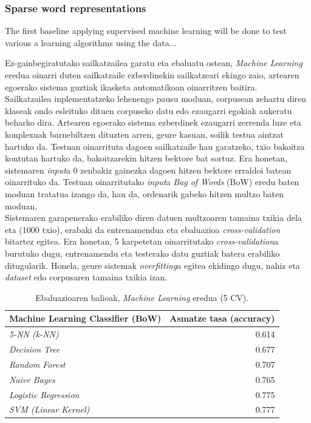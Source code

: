 \documentclass[information,article,submit,moreauthors,pdftex,10pt,a4paper]{Definitions/mdpi}
\begin{document}
\subsubsection{Sparse word representations}

The first baseline applying supervised machine learning will be done to test various a learning algorithms using the data...

Ez-gainbegiratutako sailkatzailea garatu eta ebaluatu ostean, \textit{Machine Learning} eredua oinarri duten sailkatzaile ezberdinekin sailkatzeari ekingo zaio, artearen egoerako sistema guztiak ikasketa automatikoan oinarritzen baitira.\\
\indent Sailkatzailea inplementatzeko lehenengo pausu moduan, corpusean zehaztu diren klaseak ondo esleituko dituen corpuseko datu edo ezaugarri egokiak aukeratu beharko dira. Artearen egoerako sistema ezberdinek ezaugarri zerrenda luze eta konplexuak barnebiltzen dituzten arren, geure kasuan, soilik testua aintzat hartuko da. Testuan oinarrituta dagoen sailkatzaile hau garatzeko, txio bakoitza kontutan hartuko da, bakoitzarekin hitzen bektore bat sortuz. Era honetan, sistemaren \textit{input}a 0 zenbakiz gainezka dagoen hitzen bektore erraldoi batean oinarrituko da. Testuan oinarritutako \textit{input}a \textit{Bag of Words} (BoW) eredu baten moduan tratatua izango da, hau da, ordenarik gabeko hitzen multzo baten moduan.\\
\indent Sistemaren garapenerako erabiliko diren datuen multzoaren tamaina txikia dela eta (1000 txio), erabaki da entrenamendua eta ebaluazioa \textit{cross-validation} bitartez egitea. Era honetan, 5 karpetetan oinarritutako \textit{cross-validation}a burutuko dugu, entrenamendu eta testerako datu guztiak batera erabiliko ditugularik. Honela, geure sistemak \textit{overfitting}a egitea ekidingo dugu, nahiz eta \textit{dataset} edo corpusaren tamaina txikia izan.

\begin{table}[H]
  \centering
  \begin{tabular}{|l|r|}
    \hline
    \textbf{Machine Learning Classifier (BoW)} & \textbf{Asmatze tasa (accuracy)} \\ \hline 
    \textit{5-NN (k-NN)} &  0.614 \\ \hline
    \textit{Decision Tree} &  0.677 \\ \hline
    \textit{Random Forest} &  0.707 \\ \hline
    \textit{Naive Bayes} & 0.765 \\ \hline
    \textit{Logistic Regression} & 0.775 \\ \hline
    \textit{SVM (Linear Kernel)} & 0.777 \\ \hline
  \end{tabular}
  \caption{Ebaluazioaren balioak, \textit{Machine Learning} eredua (5 CV).}
  \label{tab:acc-ml}
\end{table}
\end{document}
